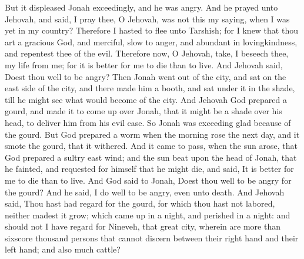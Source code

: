 But it displeased Jonah exceedingly, and he was angry. And he prayed unto Jehovah, and said, I pray thee, O Jehovah, was not this my saying, when I was yet in my country? Therefore I hasted to flee unto Tarshish; for I knew that thou art a gracious God, and merciful, slow to anger, and abundant in lovingkindness, and repentest thee of the evil. Therefore now, O Jehovah, take, I beseech thee, my life from me; for it is better for me to die than to live. And Jehovah said, Doest thou well to be angry? Then Jonah went out of the city, and sat on the east side of the city, and there made him a booth, and sat under it in the shade, till he might see what would become of the city.  And Jehovah God prepared a gourd, and made it to come up over Jonah, that it might be a shade over his head, to deliver him from his evil case. So Jonah was exceeding glad because of the gourd. But God prepared a worm when the morning rose the next day, and it smote the gourd, that it withered. And it came to pass, when the sun arose, that God prepared a sultry east wind; and the sun beat upon the head of Jonah, that he fainted, and requested for himself that he might die, and said, It is better for me to die than to live. And God said to Jonah, Doest thou well to be angry for the gourd? And he said, I do well to be angry, even unto death. And Jehovah said, Thou hast had regard for the gourd, for which thou hast not labored, neither madest it grow; which came up in a night, and perished in a night: and should not I have regard for Nineveh, that great city, wherein are more than sixscore thousand persons that cannot discern between their right hand and their left hand; and also much cattle? 